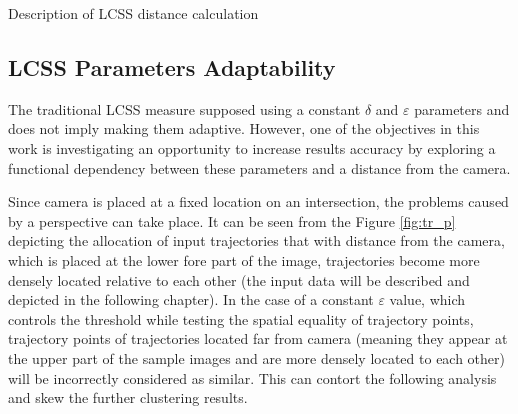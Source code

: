 \begin{algorithm}[!htb]
	\caption{Description of LCSS distance calculation}
	\label{algo:lcss-descr}
	\SetAlgoLined
\end{algorithm}

\subsection{LCSS Parameters Adaptability}

The traditional LCSS measure supposed using a constant $\delta$ and $\varepsilon$ parameters and does not imply making them adaptive. However, one of the objectives in this work is investigating an opportunity to increase results accuracy by exploring a functional dependency between these parameters and a distance from the camera. 

Since camera is placed at a fixed location on an intersection, the problems caused by a perspective can take place. It can be seen from the Figure \ref{fig:tr_p} depicting the allocation of input trajectories that with distance from the camera, which is placed at the lower fore part of the image, trajectories become more densely located relative to each other (the input data will be described and depicted in the following chapter). In the case of a constant $\varepsilon$ value, which controls the threshold while testing the spatial equality of trajectory points, trajectory points of trajectories located far from camera (meaning they appear at the upper part of the sample images and are more densely located to each other) will be incorrectly considered as similar. This can contort the following analysis and skew the further clustering results.

